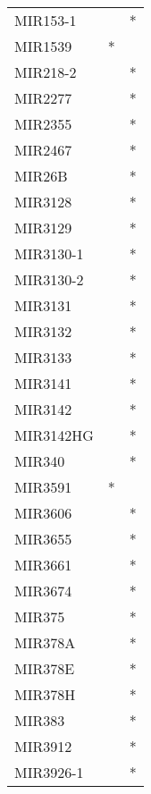\begin{longtable}{lcc}
MIR153-1        &                &          * \\
MIR1539         &              * &            \\
MIR218-2        &                &          * \\
MIR2277         &                &          * \\
MIR2355         &                &          * \\
MIR2467         &                &          * \\
MIR26B          &                &          * \\
MIR3128         &                &          * \\
MIR3129         &                &          * \\
MIR3130-1       &                &          * \\
MIR3130-2       &                &          * \\
MIR3131         &                &          * \\
MIR3132         &                &          * \\
MIR3133         &                &          * \\
MIR3141         &                &          * \\
MIR3142         &                &          * \\
MIR3142HG       &                &          * \\
MIR340          &                &          * \\
MIR3591         &              * &            \\
MIR3606         &                &          * \\
MIR3655         &                &          * \\
MIR3661         &                &          * \\
MIR3674         &                &          * \\
MIR375          &                &          * \\
MIR378A         &                &          * \\
MIR378E         &                &          * \\
MIR378H         &                &          * \\
MIR383          &                &          * \\
MIR3912         &                &          * \\
MIR3926-1       &                &          * \\

\end{longtable}
